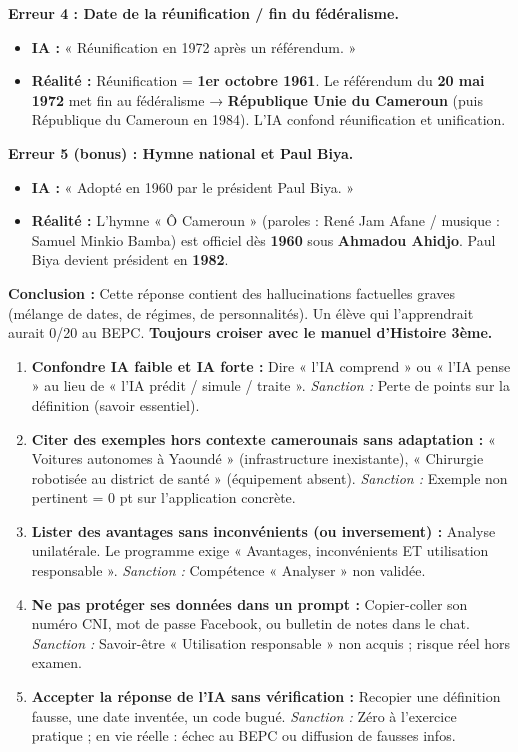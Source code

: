 \documentclass[11pt]{article}
\begin{document}
\begin{exoresolu}
\textbf{Erreur 4 : Date de la réunification / fin du fédéralisme.}
\begin{itemize}
    \item \textbf{IA :} « Réunification en 1972 après un référendum. »
    \item \textbf{Réalité :} Réunification = \textbf{1er octobre 1961}. Le référendum du \textbf{20 mai 1972} met fin au fédéralisme → \textbf{République Unie du Cameroun} (puis République du Cameroun en 1984). L'IA confond réunification et unification.
\end{itemize}

\textbf{Erreur 5 (bonus) : Hymne national et Paul Biya.}
\begin{itemize}
    \item \textbf{IA :} « Adopté en 1960 par le président Paul Biya. »
    \item \textbf{Réalité :} L'hymne « Ô Cameroun » (paroles : René Jam Afane / musique : Samuel Minkio Bamba) est officiel dès \textbf{1960} sous \textbf{Ahmadou Ahidjo}. Paul Biya devient président en \textbf{1982}.
\end{itemize}

\textbf{Conclusion :} Cette réponse contient des hallucinations factuelles graves (mélange de dates, de régimes, de personnalités). Un élève qui l'apprendrait aurait 0/20 au BEPC. \textbf{Toujours croiser avec le manuel d'Histoire 3ème.}
\end{exoresolu}

\begin{attention}
\begin{enumerate}
    \item \textbf{Confondre IA faible et IA forte :} Dire « l'IA comprend » ou « l'IA pense » au lieu de « l'IA prédit / simule / traite ». \emph{Sanction :} Perte de points sur la définition (savoir essentiel).
    \item \textbf{Citer des exemples hors contexte camerounais sans adaptation :} « Voitures autonomes à Yaoundé » (infrastructure inexistante), « Chirurgie robotisée au district de santé » (équipement absent). \emph{Sanction :} Exemple non pertinent = 0 pt sur l'application concrète.
    \item \textbf{Lister des avantages sans inconvénients (ou inversement) :} Analyse unilatérale. Le programme exige « Avantages, inconvénients ET utilisation responsable ». \emph{Sanction :} Compétence « Analyser » non validée.
    \item \textbf{Ne pas protéger ses données dans un prompt :} Copier-coller son numéro CNI, mot de passe Facebook, ou bulletin de notes dans le chat. \emph{Sanction :} Savoir-être « Utilisation responsable » non acquis ; risque réel hors examen.
    \item \textbf{Accepter la réponse de l'IA sans vérification :} Recopier une définition fausse, une date inventée, un code bugué. \emph{Sanction :} Zéro à l'exercice pratique ; en vie réelle : échec au BEPC ou diffusion de fausses infos.
\end{enumerate}
\end{attention}
\end{document}
